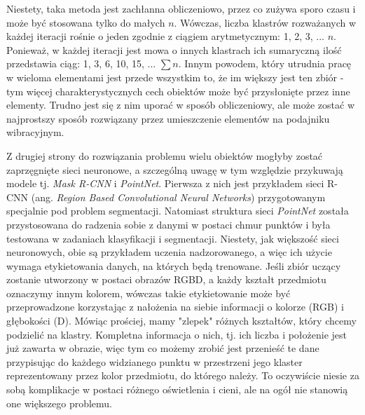 \documentclass{article}
\begin{document}
Niestety, taka metoda jest zachłanna obliczeniowo, przez co zużywa sporo czasu i może być stosowana tylko do małych $n$. Wówczas, liczba klastrów rozważanych w każdej iteracji rośnie o jeden zgodnie z ciągiem arytmetycznym: 1, 2, 3, ... $n$. Ponieważ, w każdej iteracji jest mowa o innych klastrach ich sumaryczną ilość przedstawia ciąg: 1, 3, 6, 10, 15, ... $\sum n$. Innym powodem, który utrudnia pracę w wieloma elementami jest przede wszystkim to, że im większy jest ten zbiór - tym więcej charakterystycznych cech obiektów może być przysłonięte przez inne elementy. Trudno jest się z nim uporać w sposób obliczeniowy, ale może zostać w najprostszy sposób rozwiązany przez umieszczenie elementów na podajniku wibracyjnym.

Z drugiej strony do rozwiązania problemu wielu obiektów mogłyby zostać zaprzęgnięte sieci neuronowe, a szczególną uwagę w tym względzie przykuwają modele tj. \emph{Mask R-CNN} i \emph{PointNet}. Pierwsza z nich jest przykładem sieci R-CNN (ang. \emph{Region Based Convolutional Neural Networks}) przygotowanym specjalnie pod problem segmentacji. Natomiast struktura sieci \emph{PointNet} została przystosowana do radzenia sobie z danymi w postaci chmur punktów i była testowana w zadaniach klasyfikacji i segmentacji. Niestety, jak większość sieci neuronowych, obie są przykładem uczenia nadzorowanego, a więc ich użycie wymaga etykietowania danych, na których będą trenowane. Jeśli zbiór uczący zostanie utworzony w postaci obrazów RGBD, a każdy kształt przedmiotu oznaczymy innym kolorem, wówczas takie etykietowanie może być przeprowadzone korzystając z nałożenia na siebie informacji o kolorze (RGB) i głębokości (D). Mówiąc prościej, mamy "zlepek" różnych kształtów, który chcemy podzielić na klastry. Kompletna informacja o nich, tj. ich liczba i położenie jest już zawarta w obrazie, więc tym co możemy zrobić jest przenieść te dane przypisując do każdego widzianego punktu w przestrzeni jego klaster reprezentowany przez kolor przedmiotu, do którego należy. To oczywiście niesie za sobą komplikacje w postaci różnego oświetlenia i cieni, ale na ogół nie stanowią one większego problemu.

\newpage
\end{document}
